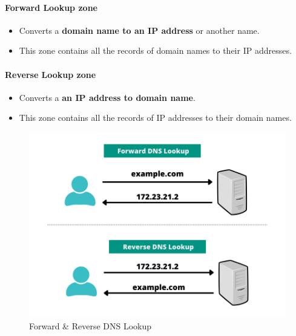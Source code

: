 \setlength{\columnsep}{3pt}
\begin{flushleft}
	\bigskip
	\paragraph{Forward Lookup zone}
	\begin{itemize}
		\item Converts a \textbf{domain name to an IP address} or another name. 
		\item This zone contains all the records of domain names to their IP addresses.
	\end{itemize}

	\paragraph{Reverse Lookup zone}
	
	\begin{itemize}
		\item Converts a \textbf{an IP address to domain name}.
		\item This zone contains all the records of IP addresses to their domain names.
	\end{itemize}

	\begin{figure}[h!]
		\centering
		\includegraphics[scale=.6]{content/chapter3/images/reverse.png}
		\caption{Forward \& Reverse DNS Lookup}
		\label{fig:dns_heir76}
	\end{figure}

\end{flushleft}

\newpage





